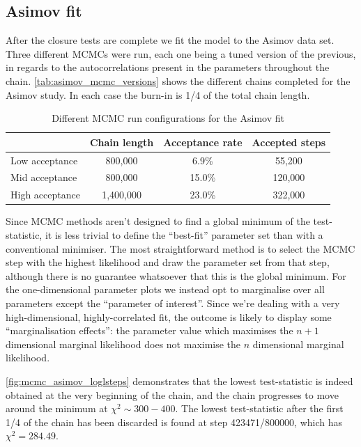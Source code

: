 \subsection{Asimov fit}
\label{sec:asimov_fit}
After the closure tests are complete we fit the model to the Asimov data set. Three different MCMCs were run, each one being a tuned version of the previous, in regards to the autocorrelations present in the parameters throughout the chain. \autoref{tab:asimov_mcmc_versions} shows the different chains completed for the Asimov study. In each case the burn-in is 1/4 of the total chain length.
\begin{table}[h]
	\centering
	\begin{tabular}{l | c c c}
		\hline
		\hline
							& Chain length  & Acceptance rate & Accepted steps\\
							\hline
		Low acceptance		& 800,000		& 6.9\% 		  & 55,200 \\
		Mid acceptance		& 800,000		& 15.0\% 		  & 120,000\\
		High acceptance		& 1,400,000		& 23.0\%  		  & 322,000 \\
		\hline
		\hline
	\end{tabular}
\caption{Different MCMC run configurations for the Asimov fit}
\label{tab:asimov_mcmc_versions}
\end{table}

Since MCMC methods aren't designed to find a global minimum of the test-statistic, it is less trivial to define the ``best-fit'' parameter set than with a conventional minimiser. The most straightforward method is to select the MCMC step with the highest likelihood and draw the parameter set from that step, although there is no guarantee whatsoever that this is the global minimum. For the one-dimensional parameter plots we instead opt to marginalise over all parameters except the ``parameter of interest''. Since we're dealing with a very high-dimensional, highly-correlated fit, the outcome is likely to display some ``marginalisation effects'': the parameter value which maximises the $n+1$ dimensional marginal likelihood does not maximise the $n$ dimensional marginal likelihood.

\autoref{fig:mcmc_asimov_loglsteps} demonstrates that the lowest test-statistic is indeed obtained at the very beginning of the chain, and the chain progresses to move around the minimum at $\chi^2 \sim 300-400$. The lowest test-statistic after the first 1/4 of the chain has been discarded is found at step 423471/800000, which has $\chi^2 = 284.49$.

